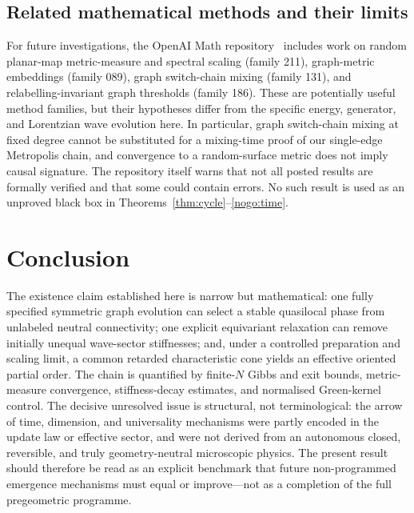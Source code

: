 \documentclass[11pt,a4paper]{article}
\numberwithin{equation}{section}
\newcommand{\1}{\mathbf{1}}
\begin{document}
\subsection{Related mathematical methods and their limits}
For future investigations, the OpenAI Math repository~\cite{openai_math,openai_catalog} includes work on random planar-map metric-measure and spectral scaling (family 211), graph-metric embeddings (family 089), graph switch-chain mixing (family 131), and relabelling-invariant graph thresholds (family 186). These are potentially useful method families, but their hypotheses differ from the specific energy, generator, and Lorentzian wave evolution here. In particular, graph switch-chain mixing at fixed degree cannot be substituted for a mixing-time proof of our single-edge Metropolis chain, and convergence to a random-surface metric does not imply causal signature. The repository itself warns that not all posted results are formally verified and that some could contain errors. No such result is used as an unproved black box in Theorems~\ref{thm:cycle}--\ref{nogo:time}.

\section{Conclusion}
The existence claim established here is narrow but mathematical: one fully specified symmetric graph evolution can select a stable quasilocal phase from unlabeled neutral connectivity; one explicit equivariant relaxation can remove initially unequal wave-sector stiffnesses; and, under a controlled preparation and scaling limit, a common retarded characteristic cone yields an effective oriented partial order. The chain is quantified by finite-$N$ Gibbs and exit bounds, metric-measure convergence, stiffness-decay estimates, and normalised Green-kernel control. The decisive unresolved issue is structural, not terminological: the arrow of time, dimension, and universality mechanisms were partly encoded in the update law or effective sector, and were not derived from an autonomous closed, reversible, and truly geometry-neutral microscopic physics. The present result should therefore be read as an explicit benchmark that future non-programmed emergence mechanisms must equal or improve---not as a completion of the full pregeometric programme.
\end{document}
